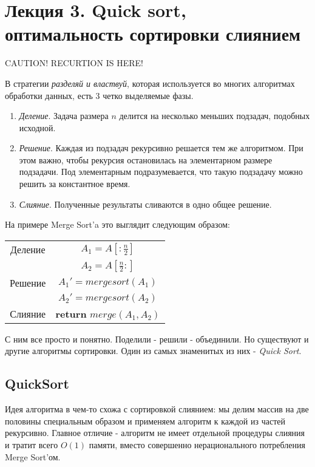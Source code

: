 \documentclass[../main.tex]{subfiles}
\begin{document}
	\section{Лекция 3. Quick sort, оптимальность сортировки слиянием}
	CAUTION! RECURTION IS HERE!
	
	
	В стратегии \textit{разделяй и властвуй}, которая используется во многих алгоритмах обработки данных, есть 3 четко выделяемые фазы.
	\begin{enumerate}
		\item \textit{Деление}. Задача размера $n$ делится на несколько меньших подзадач, подобных исходной.
		
		\item \textit{Решение}. Каждая из подзадач рекурсивно решается тем же алгоритмом. При этом важно, чтобы рекурсия остановилась на элементарном размере подзадачи. Под элементарным подразумевается, что такую подзадачу можно решить за константное время.
		
		\item \textit{Слияние}. Полученные результаты сливаются в одно общее решение.		
	\end{enumerate}
	
	На примере Merge Sort'a это выглядит следующим образом:
	\begin{center}
		\begin{tabular}{c|c}
			Деление &
			$A_1 = A[:\frac{n}{2}]$ \\
			&
			$A_2 = A[\frac{n}{2}:]$
			\\ \hline
			Решение &
			$A_1' = mergesort(A_1)$
			\\
			&
			$A_2' = mergesort(A_2)$
			\\ \hline
			Слияние &
			\textbf{return} $merge(A_1, A_2)$
		\end{tabular}
	\end{center}
	
	С ним все просто и понятно. Поделили - решили - объединили. Но существуют и другие алгоритмы сортировки. Один из самых знаменитых из них - \textit{Quick Sort}.
	
	
	
	\subsection{QuickSort}
	
	Идея алгоритма в чем-то схожа с сортировкой слиянием: мы делим массив на две половины специальным образом и применяем алгоритм к каждой из частей рекурсивно. Главное отличие - алгоритм не имеет отдельной процедуры слияния и тратит всего $O(1)$ памяти, вместо совершенно нерационального потребления Merge Sort'ом.
	
\end{document}
